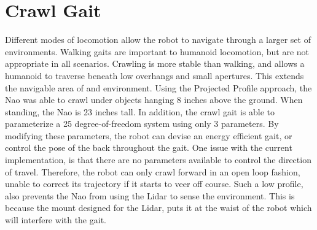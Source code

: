 \section{Crawl Gait}
Different modes of locomotion allow the robot to navigate through a larger set
of environments. Walking gaits are important to humanoid locomotion, but are
not appropriate in all scenarios.
Crawling is more stable than walking, and allows a humanoid to traverse
beneath low overhangs and small apertures. This extends the navigable area of
and environment.
Using the Projected Profile approach, the Nao was able to crawl under objects
hanging 8 inches above the ground. When standing, the Nao is 23 inches tall.
In addition, the crawl gait is able to parameterize a 25 degree-of-freedom
system using only 3 parameters. By modifying these parameters, the robot can
devise an energy efficient gait, or control the pose of the back throughout
the gait.
One issue with the current implementation, is that there are no parameters
available to control the direction of travel. Therefore, the robot can only
crawl forward in an open loop fashion, unable to correct its trajectory if it
starts to veer off course. Such a low profile, also prevents the Nao from using
the Lidar to sense the environment. This is because the mount designed for the
Lidar, puts it at the waist of the robot which will interfere with the gait.

